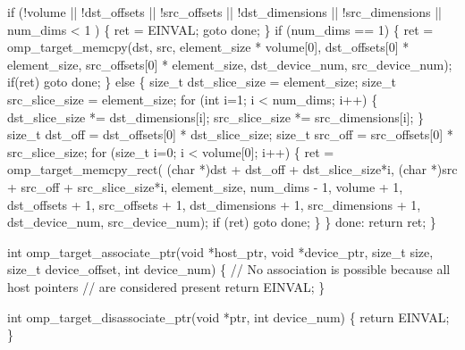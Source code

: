 {\begin{codepar}
    if (!volume || !dst\_offsets || !src\_offsets
            || !dst\_dimensions || !src\_dimensions
            || num\_dims < 1 ) \{
        ret = EINVAL;
        goto done;
    \}
    if (num\_dims == 1) \{
        ret = omp\_target\_memcpy(dst, src,
                                element\_size * volume[0],
                                dst\_offsets[0] * element\_size,
                                src\_offsets[0] * element\_size,
                                dst\_device\_num, src\_device\_num);
        if(ret) goto done;
    \} else \{
        size\_t dst\_slice\_size = element\_size;
        size\_t src\_slice\_size = element\_size;
        for (int i=1; i < num\_dims; i++) \{
            dst\_slice\_size *= dst\_dimensions[i];
            src\_slice\_size *= src\_dimensions[i];
        \}
        size\_t dst\_off = dst\_offsets[0] * dst\_slice\_size;
        size\_t src\_off = src\_offsets[0] * src\_slice\_size;
        for (size\_t i=0; i < volume[0]; i++) \{
            ret = omp\_target\_memcpy\_rect(
                        (char *)dst + dst\_off + dst\_slice\_size*i,
                        (char *)src + src\_off + src\_slice\_size*i,
                        element\_size,
                        num\_dims - 1,
                        volume + 1,
                        dst\_offsets + 1,
                        src\_offsets + 1,
                        dst\_dimensions + 1,
                        src\_dimensions + 1,
                        dst\_device\_num,
                        src\_device\_num);
            if (ret) goto done;
        \}
    \}
done:
    return ret;
\}

int omp\_target\_associate\_ptr(void *host\_ptr, void *device\_ptr,
                             size\_t size, size\_t device\_offset,
                             int device\_num)
\{
    // No association is possible because all host pointers 
    // are considered present
    return EINVAL;
\}

int omp\_target\_disassociate\_ptr(void *ptr, int device\_num)
\{
    return EINVAL;
\}

\end{codepar}} %








\pagebreak
